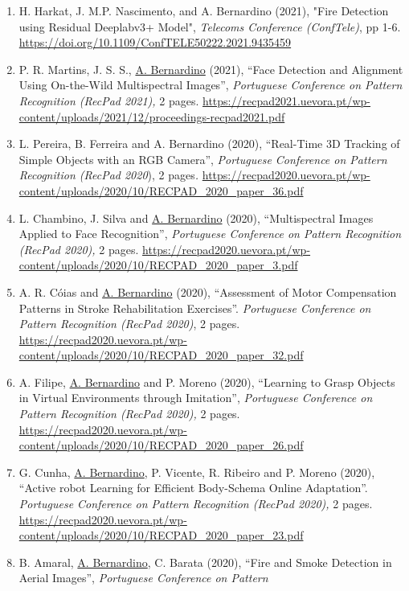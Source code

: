 \begin{enumerate}
\def\labelenumi{\arabic{enumi}.}
\item
  H. Harkat, J. M.P. Nascimento, and A. Bernardino (2021), "Fire
  Detection using Residual Deeplabv3+ Model", \emph{Telecoms Conference
  (ConfTele)}, pp 1-6.
  \url{https://doi.org/10.1109/ConfTELE50222.2021.9435459}
\item
  P. R. Martins, J. S. S., \ul{A. Bernardino} (2021), ``Face Detection
  and Alignment Using On-the-Wild Multispectral Images'',
  \emph{Portuguese Conference on Pattern Recognition (RecPad 2021),} 2
  pages.
  \url{https://recpad2021.uevora.pt/wp-content/uploads/2021/12/proceedings-recpad2021.pdf}~
\item
  L. Pereira, B. Ferreira and A. Bernardino (2020), ``Real-Time 3D
  Tracking of Simple Objects with an RGB Camera'', \emph{Portuguese
  Conference on Pattern Recognition (RecPad 2020}), 2 pages\emph{.}
  \url{https://recpad2020.uevora.pt/wp-content/uploads/2020/10/RECPAD_2020_paper_36.pdf}
\item
  L. Chambino, J. Silva and \ul{A. Bernardino} (2020), ``Multispectral
  Images Applied to Face Recognition'', \emph{Portuguese Conference on
  Pattern Recognition (RecPad 2020),} 2 pages.
  \url{https://recpad2020.uevora.pt/wp-content/uploads/2020/10/RECPAD_2020_paper_3.pdf}~
\item
  A. R. Cóias and \ul{A. Bernardino} (2020), ``Assessment of Motor
  Compensation Patterns in Stroke Rehabilitation Exercises''.
  \emph{Portuguese Conference on Pattern Recognition (RecPad 2020)}, 2
  pages.
  \url{https://recpad2020.uevora.pt/wp-content/uploads/2020/10/RECPAD_2020_paper_32.pdf}~
\item
  A. Filipe, \ul{A. Bernardino} and P. Moreno (2020), ``Learning to
  Grasp Objects in Virtual Environments through Imitation'',
  \emph{Portuguese Conference on Pattern Recognition (RecPad 2020),} 2
  pages.
  \url{https://recpad2020.uevora.pt/wp-content/uploads/2020/10/RECPAD_2020_paper_26.pdf}~
\item
  G. Cunha, \ul{A. Bernardino}, P. Vicente, R. Ribeiro and P. Moreno
  (2020), ``Active robot Learning for Efficient Body-Schema Online
  Adaptation''. \emph{Portuguese Conference on Pattern Recognition
  (RecPad 2020),} 2 pages.
  \url{https://recpad2020.uevora.pt/wp-content/uploads/2020/10/RECPAD_2020_paper_23.pdf}~
\item
  B. Amaral, \ul{A. Bernardino}, C. Barata (2020), ``Fire and Smoke
  Detection in Aerial Images'', \emph{Portuguese Conference on Pattern
}
\end{enumerate}
